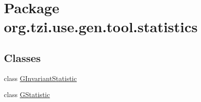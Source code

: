 \hypertarget{namespaceorg_1_1tzi_1_1use_1_1gen_1_1tool_1_1statistics}{\section{Package org.\-tzi.\-use.\-gen.\-tool.\-statistics}
\label{namespaceorg_1_1tzi_1_1use_1_1gen_1_1tool_1_1statistics}
}
\subsection*{Classes}
\begin{DoxyCompactItemize}
\item 
class \hyperlink{classorg_1_1tzi_1_1use_1_1gen_1_1tool_1_1statistics_1_1_g_invariant_statistic}{G\-Invariant\-Statistic}
\item 
class \hyperlink{classorg_1_1tzi_1_1use_1_1gen_1_1tool_1_1statistics_1_1_g_statistic}{G\-Statistic}
\end{DoxyCompactItemize}
